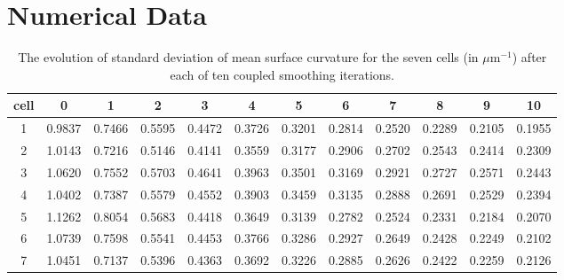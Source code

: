 \documentclass[a4paper,10pt]{article}
\begin{document}
\section{Numerical Data}

\begin{table}[H]
\begin{center}
\footnotesize
\begin{tabular}{|c|ccccccccccc|}
\hline
cell & 0 &1 &2 &3 &4 &5 &6 &7 &8 &9 &10\\
\hline

1 &0.9837 &0.7466 &0.5595 &0.4472 &0.3726 &0.3201 &0.2814 &0.2520 &0.2289 &0.2105 &0.1955\\
2 &1.0143 &0.7216 &0.5146 &0.4141 &0.3559 &0.3177 &0.2906 &0.2702 &0.2543 &0.2414 &0.2309\\
3 &1.0620 &0.7552 &0.5703 &0.4641 &0.3963 &0.3501 &0.3169 &0.2921 &0.2727 &0.2571 &0.2443\\
4 &1.0402 &0.7387 &0.5579 &0.4552 &0.3903 &0.3459 &0.3135 &0.2888 &0.2691 &0.2529 &0.2394\\
5 &1.1262 &0.8054 &0.5683 &0.4418 &0.3649 &0.3139 &0.2782 &0.2524 &0.2331 &0.2184 &0.2070\\
6 &1.0739 &0.7598 &0.5541 &0.4453 &0.3766 &0.3286 &0.2927 &0.2649 &0.2428 &0.2249 &0.2102\\
7 &1.0451 &0.7137 &0.5396 &0.4363 &0.3692 &0.3226 &0.2885 &0.2626 &0.2422 &0.2259 &0.2126\\
\hline
\end{tabular}
\end{center}
\caption{The evolution of standard deviation of mean surface curvature for the seven cells (in $\mu \text{m}^{-1}$)  after each of ten coupled smoothing iterations.}
\label{tab:curv}
\end{table}
\end{document}
